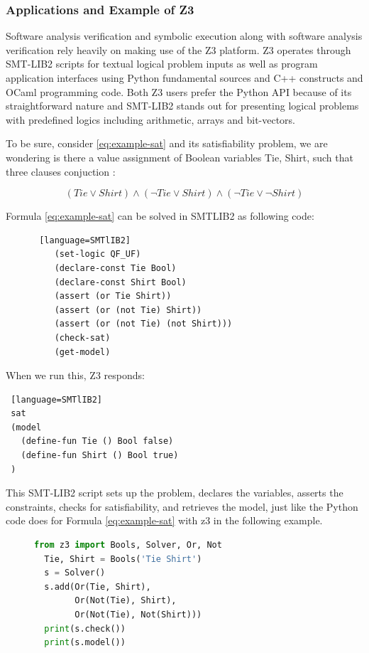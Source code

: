 \documentclass[]{rptuseminar}
\begin{document}
\subsubsection{Applications and Example of Z3}
Software analysis verification and symbolic execution along with software analysis verification rely heavily on making use of the Z3 platform. Z3 operates through SMT-LIB2 scripts for textual logical problem inputs as well as program application interfaces using Python fundamental sources and C++ constructs and OCaml programming code. Both Z3 users prefer the Python API because of its straightforward nature and SMT-LIB2 stands out for presenting logical problems with predefined logics including arithmetic, arrays and bit-vectors.
\vspace{1em}

To be sure, consider \ref{eq:example-sat} and its satisfiability problem,
we are wondering is there a value assignment of Boolean variables Tie, Shirt,
such that three clauses conjuction :


\begin{equation}
  \label{eq:example-sat}
  (Tie \lor Shirt) \land (\lnot Tie \lor Shirt) \land (\lnot Tie \lor \lnot Shirt)
\end{equation}

Formula \ref{eq:example-sat}  can be solved in SMTLIB2 as following code:

\begin{figure}[ht]
  \begin{lstlisting} [language=SMTlIB2]
    (set-logic QF_UF)
    (declare-const Tie Bool)
    (declare-const Shirt Bool)
    (assert (or Tie Shirt))
    (assert (or (not Tie) Shirt))
    (assert (or (not Tie) (not Shirt)))
    (check-sat)
    (get-model)
  \end{lstlisting}
  \end{figure}

  When we run this, Z3 responds:
\begin{lstlisting} [language=SMTlIB2]
 sat
 (model
   (define-fun Tie () Bool false)
   (define-fun Shirt () Bool true)
 )
\end{lstlisting}
\vspace{1em}

  This SMT-LIB2 script sets up the problem, declares the variables, asserts the constraints, checks for satisfiability, and retrieves the model, just like the Python code does for Formula \ref{eq:example-sat}  with z3 in the following example.

\begin{figure}[ht]
\begin{lstlisting}[language=Python]
  from z3 import Bools, Solver, Or, Not
  Tie, Shirt = Bools('Tie Shirt')
  s = Solver()
  s.add(Or(Tie, Shirt),
        Or(Not(Tie), Shirt),
        Or(Not(Tie), Not(Shirt)))
  print(s.check())
  print(s.model())
\end{lstlisting}
\end{figure}
\end{document}
